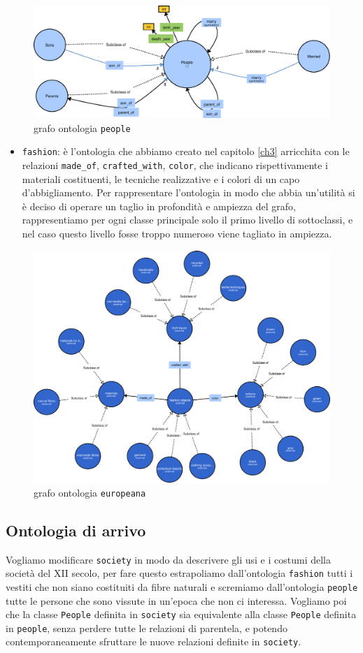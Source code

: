 \begin{figure}[H]
	\centering
	\includegraphics[width=.9\textwidth]{Picture/people.2.pdf}
	\caption{grafo ontologia \texttt{people}}
\end{figure}
\newpage
{}\label{ont_fashion}
\begin{itemize}
	\item \verb|fashion|: è l'ontologia che abbiamo creato nel capitolo \ref{ch3} arricchita con le relazioni \verb|made_of|, \verb|crafted_with|, \verb|color|, che indicano rispettivamente i materiali costituenti, le tecniche realizzative e i colori di un capo d'abbigliamento. Per rappresentare l'ontologia in modo che abbia un'utilità si è deciso di operare un taglio in profondità e ampiezza del grafo, rappresentiamo per ogni classe principale solo il primo livello di sottoclassi, e nel caso questo livello fosse troppo numeroso viene tagliato in ampiezza.
\end{itemize}
\begin{figure}[H]
	\centering	
	\includegraphics[width=.9\textwidth]{Picture/europeana_relation.pdf}
	\caption{\label{fig:ontEur}grafo ontologia \texttt{europeana}}
\end{figure}
\subsection{Ontologia di arrivo}
Vogliamo modificare \verb|society| in modo da descrivere gli usi e i costumi della società del XII secolo, per fare questo estrapoliamo dall'ontologia \verb|fashion| tutti i vestiti che non siano costituiti da fibre naturali e scremiamo dall'ontologia \verb|people| tutte le persone che sono vissute in un'epoca che non ci interessa. Vogliamo poi che la classe \verb|People| definita in \verb|society| sia equivalente alla classe \verb|People| definita in \verb|people|, senza perdere tutte le relazioni di parentela, e potendo contemporaneamente sfruttare le nuove relazioni definite in \verb|society|.
